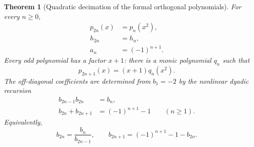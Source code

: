 \documentclass[11pt]{article}
\newtheorem{theorem}{Theorem}[section]
\theoremstyle{definition}
\theoremstyle{remark}
\begin{document}
\begin{theorem}[Quadratic decimation of the formal orthogonal polynomials]
\label{thm:tm-quadratic-op}
For every \(n\ge0\),
\begin{align}
 p_{2n}(x)&=p_n(x^2),                                      \label{eq:p-even-decimation}\\
 h_{2n}&=h_n,                                              \label{eq:h-even-decimation}\\
 a_n&=(-1)^{n+1}.                                          \label{eq:a-alternating}
\end{align}
Every odd polynomial has a factor \(x+1\): there is a monic polynomial \(q_n\) such that
\begin{equation}
 p_{2n+1}(x)=(x+1)q_n(x^2).                                \label{eq:p-odd-factor}
\end{equation}
The off-diagonal coefficients are determined from \(b_1=-2\) by the nonlinear dyadic
recursion
\begin{align}
 b_{2n-1}b_{2n}&=b_n,                                      \label{eq:b-product-rec}\\
 b_{2n}+b_{2n+1}&=(-1)^{n+1}-1\qquad(n\ge1).               \label{eq:b-sum-rec}
\end{align}
Equivalently,
\begin{equation}
 b_{2n}=\frac{b_n}{b_{2n-1}},
 \qquad
 b_{2n+1}=(-1)^{n+1}-1-b_{2n}.                             \label{eq:b-explicit-rec}
\end{equation}
\end{theorem}
\end{document}
